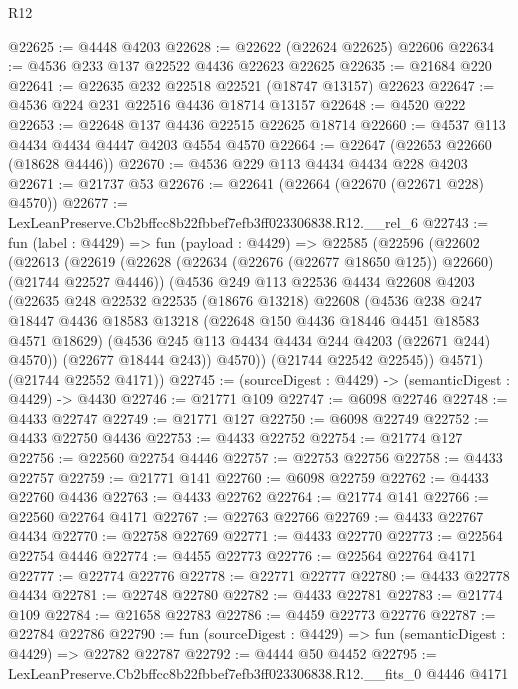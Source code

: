 \begin{lexlean}{R12}
\begin{coremodule}
@22625 := @4448 @4203
@22628 := @22622 (@22624 @22625) @22606
@22634 := @4536 @233 @137 @22522 @4436 @22623 @22625
@22635 := @21684 @220
@22641 := @22635 @232 @22518 @22521 (@18747 @13157) @22623
@22647 := @4536 @224 @231 @22516 @4436 @18714 @13157
@22648 := @4520 @222
@22653 := @22648 @137 @4436 @22515 @22625 @18714
@22660 := @4537 @113 @4434 @4434 @4447 @4203 @4554 @4570
@22664 := @22647 (@22653 @22660 (@18628 @4446))
@22670 := @4536 @229 @113 @4434 @4434 @228 @4203
@22671 := @21737 @53
@22676 := @22641 (@22664 (@22670 (@22671 @228) @4570))
@22677 := LexLeanPreserve.Cb2bffcc8b22fbbef7efb3ff023306838.R12.__rel_6
@22743 := fun (label : @4429) =>
  fun (payload : @4429) =>
  @22585
    (@22596
      (@22602
        (@22613
          (@22619
            (@22628 (@22634 (@22676 (@22677 @18650 @125)) @22660) (@21744 @22527 @4446))
            (@4536
              @249
              @113
              @22536
              @4434
              @22608
              @4203
              (@22635
                @248
                @22532
                @22535
                (@18676 @13218)
                @22608
                (@4536
                  @238
                  @247
                  @18447
                  @4436
                  @18583
                  @13218
                  (@22648 @150 @4436 @18446 @4451 @18583 @4571 @18629)
                  (@4536 @245 @113 @4434 @4434 @244 @4203 (@22671 @244) @4570))
                (@22677 @18444 @243))
              @4570))
          (@21744 @22542 @22545))
        @4571)
      (@21744 @22552 @4171))
@22745 := (sourceDigest : @4429) -> (semanticDigest : @4429) -> @4430
@22746 := @21771 @109
@22747 := @6098 @22746
@22748 := @4433 @22747
@22749 := @21771 @127
@22750 := @6098 @22749
@22752 := @4433 @22750 @4436
@22753 := @4433 @22752
@22754 := @21774 @127
@22756 := @22560 @22754 @4446
@22757 := @22753 @22756
@22758 := @4433 @22757
@22759 := @21771 @141
@22760 := @6098 @22759
@22762 := @4433 @22760 @4436
@22763 := @4433 @22762
@22764 := @21774 @141
@22766 := @22560 @22764 @4171
@22767 := @22763 @22766
@22769 := @4433 @22767 @4434
@22770 := @22758 @22769
@22771 := @4433 @22770
@22773 := @22564 @22754 @4446
@22774 := @4455 @22773
@22776 := @22564 @22764 @4171
@22777 := @22774 @22776
@22778 := @22771 @22777
@22780 := @4433 @22778 @4434
@22781 := @22748 @22780
@22782 := @4433 @22781
@22783 := @21774 @109
@22784 := @21658 @22783
@22786 := @4459 @22773 @22776
@22787 := @22784 @22786
@22790 := fun (sourceDigest : @4429) => fun (semanticDigest : @4429) => @22782 @22787
@22792 := @4444 @50 @4452
@22795 := LexLeanPreserve.Cb2bffcc8b22fbbef7efb3ff023306838.R12.__fits_0 @4446 @4171

\end{coremodule}
\end{lexlean}
